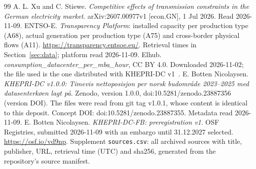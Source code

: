 \begin{thebibliography}{99}
 A. L. Xu and C. Stiewe. \emph{Competitive effects of transmission constraints in the German electricity market}. arXiv:2607.00977v1 [econ.GN], 1 Jul 2026. Read 2026-11-09. %
 ENTSO-E. \emph{Transparency Platform}: installed capacity per production type (A68), actual generation per production type (A75) and cross-border physical flows (A11). \url{https://transparency.entsoe.eu/}. Retrieval times in Section~\ref{sec:data}; platform read 2026-11-09. %
 Elhub. \emph{consumption\_datacenter\_per\_mba\_hour}, CC BY 4.0. Downloaded 2026-11-02; the file used is the one distributed with KHEPRI-DC v1~\cite{v1}. %
 E. Botten Nicolaysen. \emph{KHEPRI-DC v1.0.0: Timevis nettoposisjon per norsk budområde 2023--2025 med datasenterkøen lagt på}. Zenodo, version 1.0.0, doi:10.5281/zenodo.23887356 (version DOI). The files were read from git tag v1.0.1, whose content is identical to this deposit. Concept DOI: doi:10.5281/zenodo.23887355. Metadata read 2026-11-09. %
 E. Botten Nicolaysen. \emph{KHEPRI-DC-FB: preregistration v1}. OSF Registries, submitted 2026-11-09 with an embargo until 31.12.2027 selected. \url{https://osf.io/vd9np}. %
 Supplement \texttt{sources.csv}: all archived sources with title, publisher, URL, retrieval time (UTC) and sha256, generated from the repository's source manifest.
\end{thebibliography}


